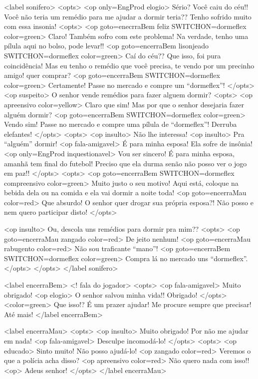 <label sonifero>
<opts>
	<op only=EngProd elogio> Sério? Você caiu do céu!! Você não teria um remédio para me ajudar a dormir teria?? Tenho sofrido muito com essa insonia!
	<opts>
	<op goto=enecrraBem feliz SWITCHON=dormeflex color=green> Claro! 			Também sofro com este problema! Na verdade, tenho uma pílula aqui no 			bolso, pode levar!!
<op goto=encerraBem  lisonjeado SWITCHON=dormeflex color=green> 		Caí do céu?? Que isso, foi pura coincidência! Mas  eu tenho o  remédio 		que você precisa, te vendo por um precinho amigo! quer comprar?
<op goto=encerraBem SWITCHON=dormeflex color=green> 			Certamente! Passe no mercado e compre um “dormeflex”!
</opts>
	<op suspeito> O senhor vende remédios para fazer alguem dormir?
	<opts>
		<op apreensivo color=yellow> Claro que sim! Mas por que o senhor 				desejaria fazer alguém dormir?
<op goto=encerraBem SWITCHON=dormeflex color=green> Vendo sim! 		Passe no mercado e compre uma pílula de “dormeflex”! Derruba 			elefantes!
</opts>
	<opts>
	<op insulto> Não lhe interessa!
	<op insulto> Pra “alguém” dormir!
	<op fala-amigavel> É para minha esposa! Ela sofre de insônia!
	<op only=EngProd inquestionavel> Vou ser sincero! É para minha esposa, amanhã tem final do futebol! Preciso que ela durma senão não posso ver o jogo em paz!!
</opts>
	<opts>
	<op goto=encerraBem SWITCHON=dormeflex compreensivo 			color=green> Muito justo o seu motivo! Aqui está, coloque na 			bebida dela ou na comida e ela vai dormir a noite toda!
	<op goto=encerraMau color=red> Que absurdo! O senhor quer 			drogar sua própria esposa?! Não posso e nem quero participar 			disto!
</opts>
	
	<op insulto> Ou, descola uns remédios para dormir pra mim??
		<opts>
			<op goto=encerraMau zangado color=red>  De jeito nenhum!
			<op goto=encerraMau rabugento color=red> Não sou traficante 					“mano”!
			<op goto=encerraBem SWITCHON=dormeflex color=green> 					Compra lá no mercado uns “dormeflex”.
</opts>
</opts>
</label sonifero>

<label encerraBem>
<! fala do jogador>
	<opts>
		<op fala-amigavel> Muito obrigado!
		<op elogio> O senhor salvou minha vida!! Obrigado!
</opts>
<color=green> Que isso!? É um prazer ajudar! Me procure sempre que precisar! Até mais!
</label encerraBem>

<label encerraMau>
	<opts>
		<op insulto> Muito obrigado! Por não me ajudar em nada!
		<op fala-amigavel> Desculpe incomodá-lo!
</opts>
<opts>
	<op educado> Sinto muito! Não posso ajudá-lo!
	<op zangado color=red> Veremos o que a polícia acha disso?
	<op apreensivo color=red> Não quero nada com isso!!
	<op> Adeus senhor!
</opts>
</label encerraMau>